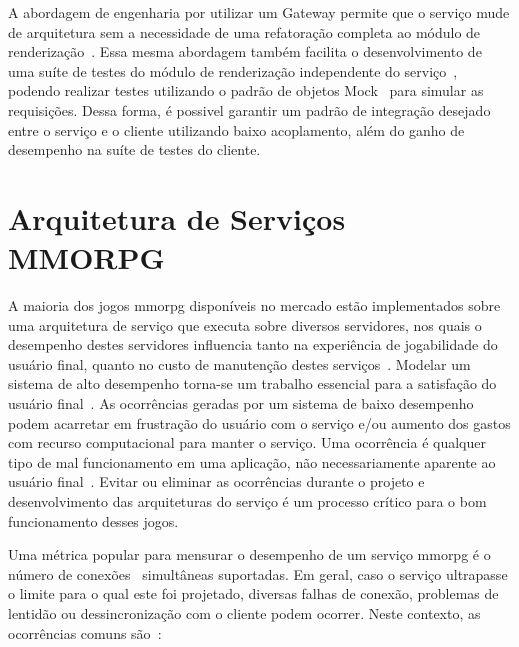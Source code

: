 A abordagem de engenharia por utilizar um Gateway permite que o serviço mude de arquitetura sem a necessidade de uma refatoração completa ao módulo de renderização~\cite{albion_online_unite, stephenclarkewillson2017}.
%
Essa mesma abordagem também facilita o desenvolvimento de uma suíte de testes do módulo de renderização independente do serviço~\cite{Freeman2009Oct}, podendo realizar testes utilizando o padrão de objetos Mock~\cite{Beck2004Nov} para simular as requisições.
%
Dessa forma, é possivel garantir um padrão de integração desejado entre o serviço e o cliente utilizando baixo acoplamento, além do ganho de desempenho na suíte de testes do cliente.



\section{Arquitetura de Serviços MMORPG}
\label{sec:arquiteturas}



A maioria dos jogos \ac{mmorpg} disponíveis no mercado estão implementados sobre uma arquitetura de serviço que executa sobre diversos servidores\cite{stephenclarkewillson2017}, nos quais o desempenho destes servidores influencia tanto na experiência de jogabilidade do usuário final, quanto no custo de manutenção destes serviços~\cite{1417630}.
%
Modelar um sistema de alto desempenho torna-se um trabalho essencial para a satisfação do usuário final~\cite{1417630}.
%
As ocorrências geradas por um sistema de baixo desempenho podem acarretar em frustração do usuário com o serviço e/ou aumento dos gastos com recurso computacional para manter o serviço.
%
Uma ocorrência é qualquer tipo de mal funcionamento em uma aplicação, não necessariamente aparente ao usuário final~\cite{1417630}.
%
Evitar ou eliminar as ocorrências durante o projeto e desenvolvimento das arquiteturas do serviço é um processo crítico para o bom funcionamento desses jogos.



Uma métrica popular para mensurar o desempenho de um serviço \ac{mmorpg} é o número de conexões~\cite{1417630} simultâneas suportadas.
%
Em geral, caso o serviço ultrapasse o limite para o qual este foi projetado, diversas falhas de conexão, problemas de lentidão ou dessincronização com o cliente podem ocorrer.
%
Neste contexto, as ocorrências comuns são~\cite{1417630}:



